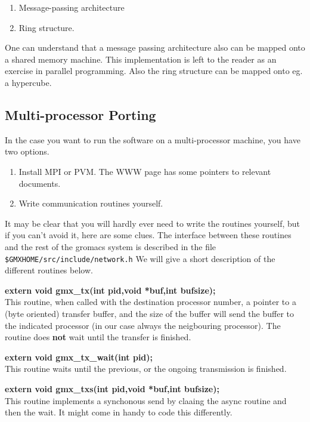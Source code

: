 \begin{enumerate}
\item Message-passing architecture
\item Ring structure.
\end{enumerate}

One can understand that a message passing architecture also can be
mapped onto a shared memory machine. This implementation is left to
the reader as an exercise in parallel programming. Also the ring
structure can be mapped onto eg. a hypercube.

\subsection{Multi-processor Porting}

In the case you want to run the {\gromacs} software on a
multi-processor machine, you have two options.
\begin{enumerate}
\item	Install MPI or PVM. The {\gromacs} WWW page has some pointers
	to relevant documents.
\item	Write communication routines yourself. 
\end{enumerate}

It may be clear that you will hardly ever need to write the routines
yourself, but if you can't avoid it, here are some clues.
The interface between these routines and the
rest of the gromacs system is described in the file {\tt
\$GMXHOME/src/include/network.h} We will give a short description of the
different routines below.

{\bf extern void gmx\_tx(int pid,void *buf,int bufsize);}\\ 

This routine, when called with the destination processor number, a
pointer to a (byte oriented) transfer buffer, and the size of the
buffer will send the buffer to the indicated processor (in our case
always the neigbouring processor). The routine does {\bf not} wait
until the transfer is finished.

\smallskip

{\bf extern void gmx\_tx\_wait(int pid);}\\
This routine waits until the previous, or the ongoing transmission is finished.

\smallskip


{\bf extern void gmx\_txs(int pid,void *buf,int bufsize);}\\
This routine implements a synchonous send by claaing the async routine and then
the wait. It might come in handy to code this differently.

